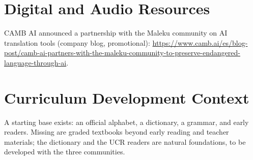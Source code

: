\documentclass[12pt]{article}
\begin{document}
\section{Digital and Audio Resources}
CAMB AI announced a partnership with the Maleku community on AI translation tools (company blog, promotional): \url{https://www.camb.ai/es/blog-post/camb-ai-partners-with-the-maleku-community-to-preserve-endangered-language-through-ai}.

\section{Curriculum Development Context}
A starting base exists: an official alphabet, a dictionary, a grammar, and early readers. Missing are graded textbooks beyond early reading and teacher materials; the dictionary and the UCR readers are natural foundations, to be developed with the three communities.
\end{document}

